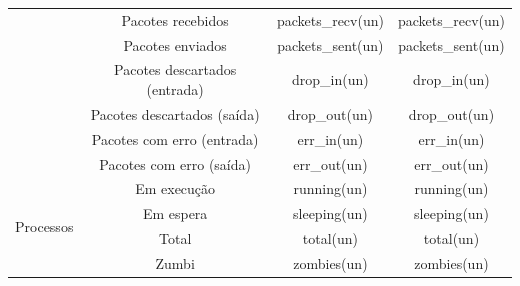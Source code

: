 \begin{table}[H]
\begin{adjustbox}{max width=\textwidth}
\begin{tabular}{|c|c|c|c|}
                      & Pacotes recebidos & packets\_recv(un)   & packets\_recv(un) \\ \cline{2-4}
                      & Pacotes enviados & packets\_sent(un)   & packets\_sent(un) \\ \cline{2-4}
                      & Pacotes descartados (entrada) & drop\_in(un)        & drop\_in(un)          \\ \cline{2-4}
                      & Pacotes descartados (saída) & drop\_out(un)       & drop\_out(un)         \\ \cline{2-4}
                      & Pacotes com erro (entrada) & err\_in(un)         & err\_in(un)         \\ \cline{2-4}
                      & Pacotes com erro (saída) & err\_out(un)        & err\_out(un)       \\ \hline
\multirow{4}{*}{Processos} & Em execução & running(un)  & running(un)  \\ \cline{2-4}
                           & Em espera & sleeping(un) & sleeping(un) \\ \cline{2-4}
                           & Total & total(un)    & total(un)    \\ \cline{2-4}
                           & Zumbi & zombies(un)  & zombies(un)  \\ \hline
\end{tabular}
\end{adjustbox}
\end{table}